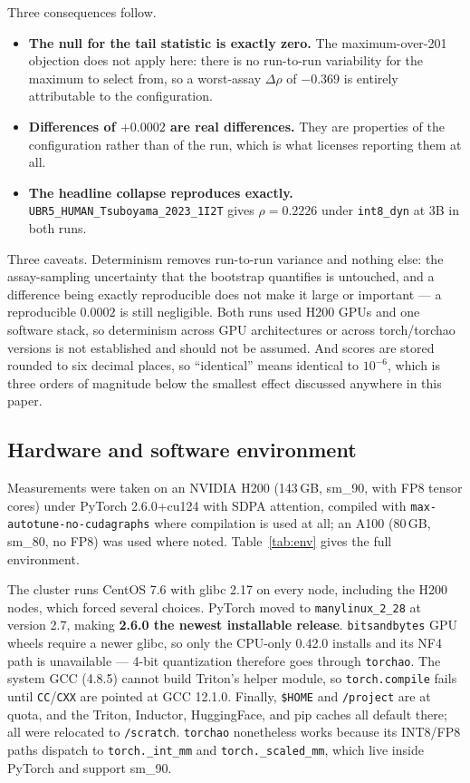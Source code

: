 \documentclass[11pt]{article}
\newcommand{\cfg}[1]{\texttt{#1}}
\begin{document}
Three consequences follow.

\begin{itemize}\setlength{\itemsep}{2pt}
  \item \textbf{The null for the tail statistic is exactly zero.} The
        maximum-over-201 objection does not apply here: there is no run-to-run
        variability for the maximum to select from, so a worst-assay
        $\Delta\rho$ of $-0.369$ is entirely attributable to the configuration.
  \item \textbf{Differences of $+0.0002$ are real differences.} They are
        properties of the configuration rather than of the run, which is what
        licenses reporting them at all.
  \item \textbf{The headline collapse reproduces exactly.}
        \texttt{UBR5\_HUMAN\_Tsuboyama\_2023\_1I2T} gives $\rho = 0.2226$ under
        \cfg{int8\_dyn} at 3B in both runs.
\end{itemize}

Three caveats. Determinism removes run-to-run variance and nothing else: the
assay-sampling uncertainty that the bootstrap quantifies is untouched, and a
difference being exactly reproducible does not make it large or important --- a
reproducible $0.0002$ is still negligible. Both runs used H200 GPUs and one
software stack, so determinism across GPU architectures or across
torch/torchao versions is not established and should not be assumed. And scores
are stored rounded to six decimal places, so ``identical'' means identical to
$10^{-6}$, which is three orders of magnitude below the smallest effect
discussed anywhere in this paper.

\subsection{Hardware and software environment}

Measurements were taken on an NVIDIA H200 (143\,GB, sm\_90, with FP8 tensor
cores) under PyTorch 2.6.0+cu124 with SDPA attention, compiled with
\texttt{max-autotune-no-cudagraphs} where compilation is used at all; an A100
(80\,GB, sm\_80, no FP8) was used where noted. Table~\ref{tab:env} gives the
full environment.

The cluster runs CentOS 7.6 with glibc 2.17 on every node, including the H200
nodes, which forced several choices. PyTorch moved to \texttt{manylinux\_2\_28}
at version 2.7, making \textbf{2.6.0 the newest installable release}.
\texttt{bitsandbytes} GPU wheels require a newer glibc, so only the CPU-only
0.42.0 installs and its NF4 path is unavailable --- 4-bit quantization therefore
goes through \texttt{torchao}. The system GCC (4.8.5) cannot build Triton's
helper module, so \texttt{torch.compile} fails until \texttt{CC}/\texttt{CXX}
are pointed at GCC 12.1.0. Finally, \texttt{\$HOME} and \texttt{/project} are at
quota, and the Triton, Inductor, HuggingFace, and pip caches all default there;
all were relocated to \texttt{/scratch}. \texttt{torchao} nonetheless works
because its INT8/FP8 paths dispatch to \texttt{torch.\_int\_mm} and
\texttt{torch.\_scaled\_mm}, which live inside PyTorch and support sm\_90.
\end{document}
